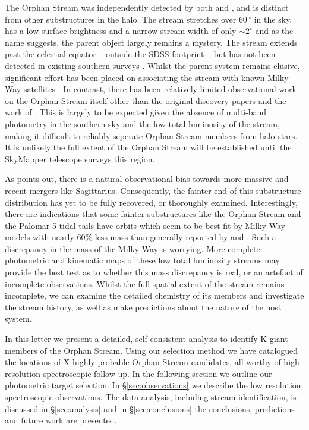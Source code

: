 \documentclass{emulateapj}
\begin{document}
The Orphan Stream was independently detected by both \citet{Grillmair;Dionatos_2006} and \citet{Belokurov;et-al_2006}, and is distinct from other substructures in the halo. The stream stretches over $60\,^\circ$ in the sky, has a low surface brightness and a narrow stream width of only $\sim2^\circ$ and as the name suggests, the parent object largely remains a mystery. The stream extends past the celestial equator \--- outside the SDSS footprint \--- but has not been detected in existing southern surveys \citep{Newberg;et-al_2010}. Whilst the parent system remains elusive, significant effort has been placed on associating the stream with known Milky Way satellites \citep{Zucker;et-al_2006, Fellhaur;et-al_2007,Jin;Lynden_Bell_2007,Sales;et-al_2008}. In contrast, there has been relatively limited observational work on the Orphan Stream itself other than the original discovery papers \citep{Grillmair;Dionatos_2006, Belokurov;et-al_2006, Belokurov;et-al_2007} and the work of \citet{Newberg;et-al_2010}. This is largely to be expected given the absence of multi-band photometry in the southern sky and the low total luminosity of the stream, making it difficult to reliably seperate Orphan Stream members from halo stars. It is unlikely the full extent of the Orphan Stream will be established until the SkyMapper telescope \citep{Keller;et-al_2007} surveys this region. 

As \citet{Sales;et-al_2008} points out, there is a natural observational bias towards more massive and recent mergers like Sagittarius. Consequently, the fainter end of this substructure distribution has yet to be fully recovered, or thoroughly examined. Interestingly, there are indications that  some fainter substructures like the Orphan Stream and the Palomar 5 tidal tails \citep{Odenkirchen;et-al_2009} have orbits which seem to be best-fit by Milky Way models with nearly 60\% less mass \citep{Newberg;et-al_2010} than generally reported by \citet{Xue;et-al_2008} and \citet{Koposov;et-al_2010}. Such a discrepancy in the mass of the Milky Way is worrying. More complete photometric and kinematic maps of these low total luminosity streams may provide the best test as to whether this mass discrepancy is real, or an artefact of incomplete observations. Whilst the full spatial extent of the stream remains incomplete, we can examine the detailed chemistry of its members and investigate the stream history, as well as make predictions about the nature of the host system.

In this letter we present a detailed, self-consistent analysis to identify K giant members of the Orphan Stream. Using our selection method we have catalogued the locations of X highly probable Orphan Stream candidates, all worthy of high resolution spectroscopic follow up. In the following section we outline our photometric target selection. In \S\ref{sec:observations} we describe the low resolution spectroscopic observations. The data analysis, including stream identification, is discussed in \S\ref{sec:analysis} and in \S\ref{sec:conclusions} the conclusions, predictions and future work are presented.
\end{document}

